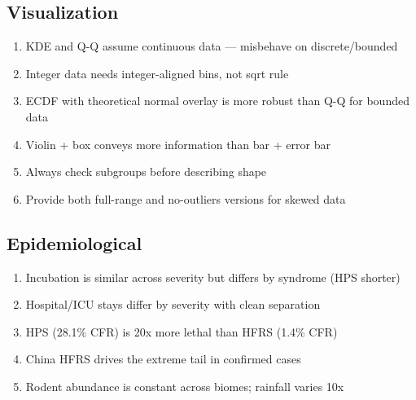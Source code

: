 \documentclass[11pt,a4paper]{article}
\begin{document}
\subsection{Visualization}
\begin{enumerate}
\item KDE and Q-Q assume continuous data --- misbehave on discrete/bounded
\item Integer data needs integer-aligned bins, not sqrt rule
\item ECDF with theoretical normal overlay is more robust than Q-Q for bounded data
\item Violin + box conveys more information than bar + error bar
\item Always check subgroups before describing shape
\item Provide both full-range and no-outliers versions for skewed data
\end{enumerate}

\subsection{Epidemiological}
\begin{enumerate}
\item Incubation is similar across severity but differs by syndrome (HPS shorter)
\item Hospital/ICU stays differ by severity with clean separation
\item HPS (28.1\% CFR) is 20x more lethal than HFRS (1.4\% CFR)
\item China HFRS drives the extreme tail in confirmed cases
\item Rodent abundance is constant across biomes; rainfall varies 10x
\end{enumerate}
\end{document}
